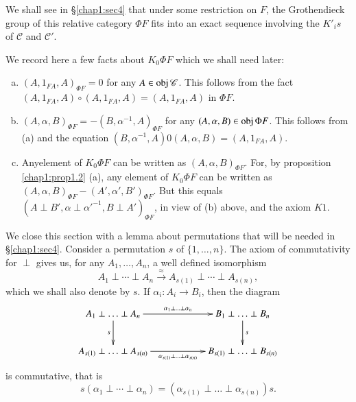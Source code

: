 We shall see in \S \ref{chap1:sec4} that under some restriction on $F$, the
Grothendieck group of this relative category $\Phi F$ fits into an
exact sequence involving the $K'_i s$ of $\mathscr{C}$ and
$\mathscr{C}'$. 

We record here a few facts about $K_0 \Phi F$ which we shall need later:

\setcounter{remark}{2}
\begin{remark}%
\begin{enumerate}[(a)]
\item $(A, 1_{FA}, A)_{\Phi F} = 0$ for any $A \in \operatorname{obj}
  \mathscr{C}$. This follows from the fact $(A, 1_{FA}, A) \circ (A,
  1_{FA}, A) = (A, 1_{FA}, A)$ in $\Phi F$. 

\item $(A, \alpha, B)_{\Phi F} = -(B, \alpha^{-1}, A)_{\Phi F}$ for
  any $(A, \alpha, B) \in \operatorname{obj} \Phi F$. This follows from (a) and the
  equation $(B, \alpha^{-1}, A) 0 (A, \alpha, B) = (A, 1_{FA}, A)$. 

\item Any\pageoriginale element of $K_0 \Phi F$ can be written as $(A, \alpha,
  B)_{\Phi F}$. For, by proposition \ref{chap1:prop1.2} (a), any
  element of $K_0 \Phi 
  F$ can be written as $(A, \alpha, B)_{\Phi F} - (A', \alpha',
  B')_{\Phi F}$. But this equals $(A \perp B', \alpha \perp
  \alpha'^{-1}, B \perp A')_{\Phi F}$, in view of (b) above, and the
  axiom $K1$. 
\end{enumerate}
\end{remark}

We close this section with a lemma about permutations that will be
needed in \S \ref{chap1:sec4}. Consider a permutation $s$ of $\{ 1, \ldots,
n\}$. The axiom of commutativity for $\perp$ gives us, for any
$A_1, \ldots, A_n$, a well defined isomorphism 
$$
A_1 \perp \cdots \perp A_n \xrightarrow{\approx} A_{s(1)} \perp \cdots 
\perp A_{s(n)},  
$$
which we shall also denote by $s$. If $\alpha_i : A_i \to B_i$, then
the diagram 
\[
\xymatrix@C=2cm{
A_1 \perp \ldots \perp A_n \ar[r]^{\alpha_1 \perp \ldots \perp
  \alpha_n} \ar[d]_s & B_1 \perp \ldots \perp B_n \ar[d]^s\\
A_{s(1)} \perp \ldots \perp A_{s(n)} \ar[r]_{\alpha_{s(1)} \perp
  \ldots \perp \alpha_{s(n)}} & B_{s(1)} \perp \ldots \perp B_{s(n)}
}
\]
is commutative, that is 
\begin{equation*}
s(\alpha_1 \perp \cdots \perp \alpha_n) = (\alpha_{s(1)} \perp \ldots
\perp \alpha_{s(n)})s. \tag{1.4}\label{eq1.4} 
\end{equation*}

